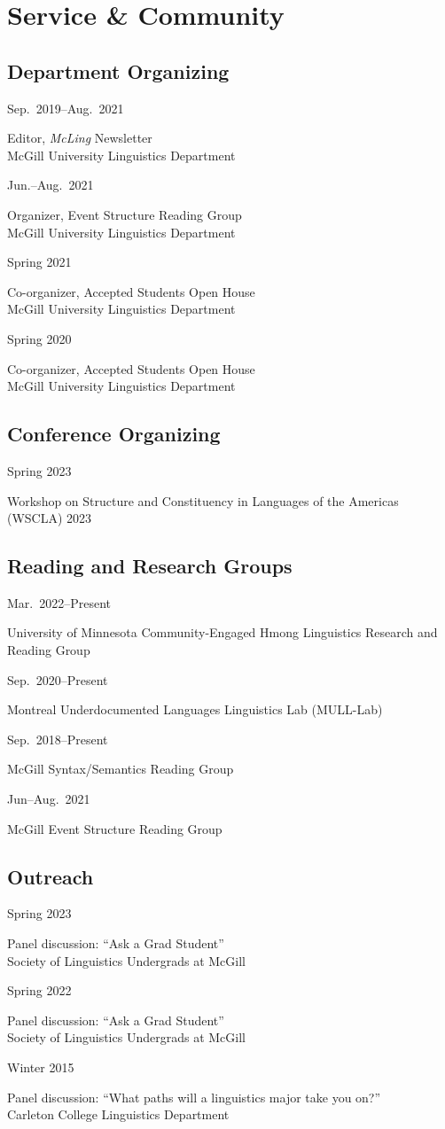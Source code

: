 \documentclass[11pt,oneside,DIV=9,parskip=off]{scrarticle} %
\newlength{\leftcolwidth}
\newlength{\rightcolwidth}
\newlength{\spacingbefore}
\newlength{\spacingafter}
\newcommand{\mytwocol}[2]{%
	\vspace{\spacingbefore}%
	\begin{minipage}[t]{\leftcolwidth}%
		\strut#1%
	\end{minipage}%
	\begin{minipage}[t]{\rightcolwidth}%
		\strut#2%
	\end{minipage}%
	\vspace{\spacingafter}\par%
	}
\newcommand{\cvline}[2]{%
	\mytwocol{#1}{#2}%
	}
\begin{document}

\section{Service \& Community}

\subsection{Department Organizing}
\cvline{Sep.\ 2019--Aug.\ 2021}{Editor, \textit{McLing} Newsletter\\McGill University Linguistics Department}
\cvline{Jun.--Aug.\ 2021}{Organizer, Event Structure Reading Group\\McGill University Linguistics Department}
\cvline{Spring 2021}{Co-organizer, Accepted Students Open House\\McGill University Linguistics Department}
\cvline{Spring 2020}{Co-organizer, Accepted Students Open House\\McGill University Linguistics Department}

\subsection{Conference Organizing}
\cvline{Spring 2023}{Workshop on Structure and Constituency in Languages of the Americas (WSCLA) 2023}

\subsection{Reading and Research Groups}
\cvline{Mar.\ 2022--Present}{University of Minnesota Community-Engaged Hmong Linguistics Research and Reading Group}
\cvline{Sep.\ 2020--Present}{Montreal Underdocumented Languages Linguistics Lab (MULL-Lab)}
\cvline{Sep.\ 2018--Present}{McGill Syntax/Semantics Reading Group}
\cvline{Jun--Aug.\ 2021}{McGill Event Structure Reading Group}

\subsection{Outreach}
\cvline{Spring 2023}{Panel discussion: ``Ask a Grad Student''\\Society of Linguistics Undergrads at McGill}
\cvline{Spring 2022}{Panel discussion: ``Ask a Grad Student''\\Society of Linguistics Undergrads at McGill}
\cvline{Winter 2015}{Panel discussion: ``What paths will a linguistics major take you on?''\\Carleton College Linguistics Department}
						
\end{document}
